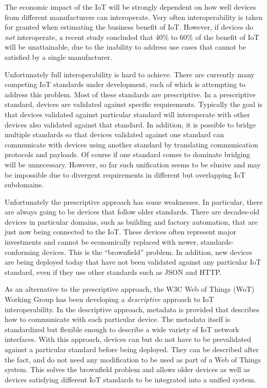 The economic impact of the IoT will be strongly dependent on how well devices from 
different manufacturers can interoperate.
Very often interoperability is taken for granted when estimating the business
benefit of IoT. 
However, if devices do \emph{not} interoperate,
a recent study \cite{McK2015a} concluded that 40\% to 60\% of the 
benefit of IoT will be unattainable,
due to the inability to address use cases that cannot be satisfied by a single manufacturer.

Unfortunately full interoperability is hard to achieve.
There are currently many competing IoT standards under development,
each of which is attempting to address this problem.
Most of these standards are prescriptive.
In a prescriptive standard,
devices are validated against specific requirements.
Typically the goal is that devices validated against particular standard will interoperate with
other devices also validated against that standard.
In addition, it is possible to bridge multiple standards so that
devices validated against one standard can communicate with
devices using another standard by translating communication protocols and payloads.
Of course if one standard comes to dominate bridging will be unnecessary.
However, so far such unification seems to be elusive and may be impossible due to
divergent requirements in different but overlapping IoT subdomains.

Unfortunately the prescriptive approach has some weaknesses.
In particular, there are always going to be devices that follow older standards.
There are decades-old devices in particular domains, such as building and factory
automation, that are just now being connected to the IoT.
These devices often represent major investments and cannot be economically replaced with newer,
standards-conforming devices.
This is the ``brownfield'' problem.
In addition,
new devices are being deployed today that have not been validated
against any particular IoT standard,
even if they use other standards such as JSON and HTTP.

As an alternative to the prescriptive approach,
the W3C Web of Things (WoT) Working Group has been developing a \emph{descriptive} 
approach to IoT interoperability.
In the descriptive approach,
metadata is provided that describes how to communicate with each particular device.
The metadata itself is standardized but flexible enough to describe a wide variety of
IoT network interfaces.
With this approach,
devices can but do not have to be prevalidated against 
a particular standard before being deployed.
They can be described after the fact,
and do not need any modification to be
used as part of a Web of Things system.
This solves the brownfield problem and allows
older devices as well as devices satisfying different IoT 
standards to be integrated into a unified system.  

